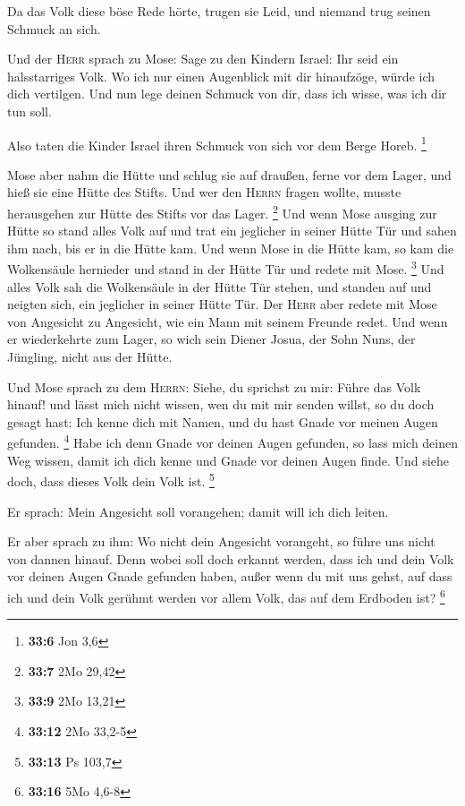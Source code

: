  Da das Volk diese böse Rede hörte, trugen sie Leid, und
niemand trug seinen Schmuck an sich.

 Und der \textsc{Herr} sprach zu Mose: Sage zu den Kindern
Israel: Ihr seid ein halsstarriges Volk. Wo ich nur einen Augenblick mit
dir hinaufzöge, würde ich dich vertilgen. Und nun lege deinen Schmuck
von dir, dass ich wisse, was ich dir tun soll.

 Also taten die Kinder Israel ihren Schmuck von sich vor
dem Berge Horeb. \footnote{\textbf{33:6} Jon 3,6}

 Mose aber nahm die Hütte und schlug sie auf draußen,
ferne vor dem Lager, und hieß sie eine Hütte des Stifts. Und wer den
\textsc{Herrn} fragen wollte, musste herausgehen zur Hütte des Stifts
vor das Lager. \footnote{\textbf{33:7} 2Mo 29,42}  Und
wenn Mose ausging zur Hütte so stand alles Volk auf und trat ein
jeglicher in seiner Hütte Tür und sahen ihm nach, bis er in die Hütte
kam.  Und wenn Mose in die Hütte kam, so kam die
Wolkensäule hernieder und stand in der Hütte Tür und redete mit Mose.
\footnote{\textbf{33:9} 2Mo 13,21}  Und alles Volk sah
die Wolkensäule in der Hütte Tür stehen, und standen auf und neigten
sich, ein jeglicher in seiner Hütte Tür.  Der
\textsc{Herr} aber redete mit Mose von Angesicht zu Angesicht, wie ein
Mann mit seinem Freunde redet. Und wenn er wiederkehrte zum Lager, so
wich sein Diener Josua, der Sohn Nuns, der Jüngling, nicht aus der
Hütte.

 Und Mose sprach zu dem \textsc{Herrn}: Siehe, du
sprichst zu mir: Führe das Volk hinauf! und lässt mich nicht wissen, wen
du mit mir senden willst, so du doch gesagt hast: Ich kenne dich mit
Namen, und du hast Gnade vor meinen Augen gefunden. \footnote{\textbf{33:12}
  2Mo 33,2-5}  Habe ich denn Gnade vor deinen Augen
gefunden, so lass mich deinen Weg wissen, damit ich dich kenne und Gnade
vor deinen Augen finde. Und siehe doch, dass dieses Volk dein Volk ist.
\footnote{\textbf{33:13} Ps 103,7}

 Er sprach: Mein Angesicht soll vorangehen; damit will
ich dich leiten.

 Er aber sprach zu ihm: Wo nicht dein Angesicht
vorangeht, so führe uns nicht von dannen hinauf.  Denn
wobei soll doch erkannt werden, dass ich und dein Volk vor deinen Augen
Gnade gefunden haben, außer wenn du mit uns gehst, auf dass ich und dein
Volk gerühmt werden vor allem Volk, das auf dem Erdboden ist?
\footnote{\textbf{33:16} 5Mo 4,6-8}

